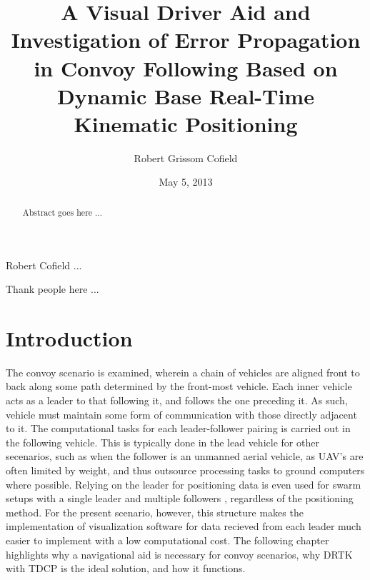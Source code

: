 \documentclass[12pt]{report}
\title{A Visual Driver Aid and Investigation of Error Propagation in Convoy Following Based on Dynamic Base Real-Time Kinematic Positioning}
\author{Robert Grissom Cofield}
\date{May 5, 2013}
\begin{document}

\begin{romanpages}

\ApprovalPage
\TitlePage
\CopyrightPage

\begin{vita}%
Robert Cofield ...
\end{vita}


\begin{abstract}
Abstract goes here ...
\end{abstract}


\begin{acknowledgments}
Thank people here ...
\end{acknowledgments}


\StylePage

\tableofcontents
\listoffigures
\listoftables

\printnomenclature[0.75in] 

\end{romanpages}

\normalem       %


\chapter{Introduction}

The convoy scenario is examined, wherein a chain of vehicles are aligned front to back along some path determined by the front-most vehicle. Each inner vehicle acts as a leader to that following it, and follows the one preceding it. As such, vehicle must maintain some form of communication with those directly adjacent to it.
The computational tasks for each leader-follower pairing is carried out in the following vehicle. This is typically done in the lead vehicle for other secenarios, such as when the follower is an unmanned aerial vehicle, as UAV's are often limited by weight, and thus outsource processing tasks to ground computers where possible. Relying on the leader for positioning data is even used for swarm setups with a single leader and multiple followers \cite{gian}, regardless of the positioning method. For the present scenario, however, this structure makes the implementation of visualization software for data recieved from each leader much easier to implement with a low computational cost. The following chapter highlights why a navigational aid is necessary for convoy scenarios, why DRTK with TDCP is the ideal solution, and how it functions.
\end{document}
